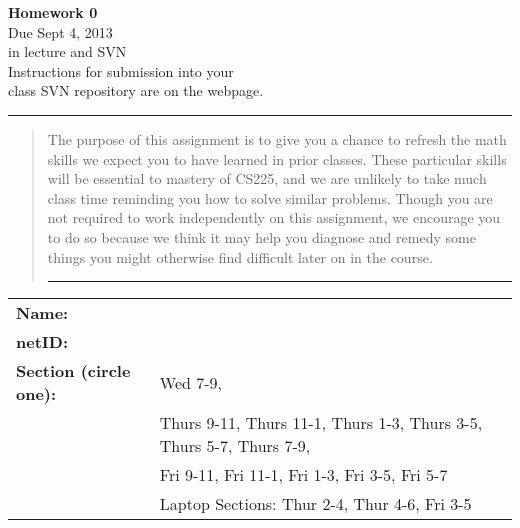 \documentclass[11pt]{article}
\begin{document}

\begin{center}
\LARGE
\textbf{Homework 0}
\\[1ex]
\Large Due Sept 4, 2013 \\ in lecture and SVN \\ \large Instructions for submission into your \\ class SVN repository are on the webpage.
\end{center}

\bigskip\hrule
\begin{quote}
The purpose of this assignment is to give you 
a chance to refresh the math skills we expect you to have learned in prior classes.  These particular skills will be essential to 
mastery of CS225, and we are unlikely to take much class time reminding you how to solve similar problems.  Though you are
not required to work independently on this assignment, we encourage you to do so because we think it may help you diagnose and 
remedy some things you might otherwise find difficult later on in the course.

\bigskip
\hrule\bigskip

\end{quote}

\begin{table}[h]
\centering
\renewcommand{\arraystretch}{1.5}
\begin{tabular}{l l }
\bfseries{Name:} & \\
\bfseries{netID:} & \\
\bfseries{Section} (circle one): & Wed 7-9, \\
 & Thurs 9-11, Thurs 11-1,	Thurs 1-3, Thurs 3-5, Thurs 5-7, Thurs 7-9, \\
 & Fri 9-11, Fri 11-1, Fri 1-3, Fri 3-5, Fri 5-7\\
 & Laptop Sections: Thur 2-4, Thur 4-6, Fri 3-5 \\
\end{tabular}
\end{table}
\end{document}
